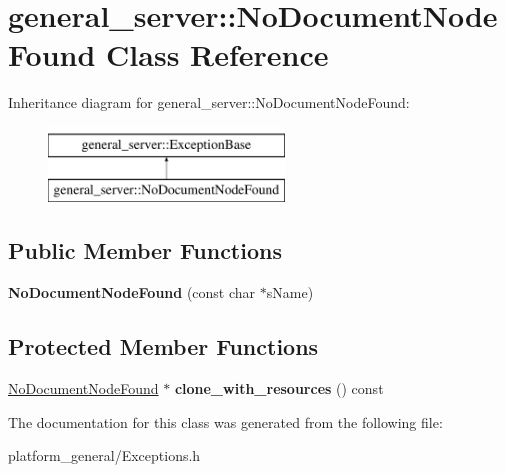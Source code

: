 \hypertarget{classgeneral__server_1_1NoDocumentNodeFound}{\section{general\-\_\-server\-:\-:\-No\-Document\-Node\-Found \-Class \-Reference}
\label{classgeneral__server_1_1NoDocumentNodeFound}
}
\-Inheritance diagram for general\-\_\-server\-:\-:\-No\-Document\-Node\-Found\-:\begin{figure}[H]
\begin{center}
\leavevmode
\includegraphics[height=2.000000cm]{classgeneral__server_1_1NoDocumentNodeFound}
\end{center}
\end{figure}
\subsection*{\-Public \-Member \-Functions}
\begin{DoxyCompactItemize}
\item 
\hypertarget{classgeneral__server_1_1NoDocumentNodeFound_a749c9293a9c289e439cbd3fee494a439}{{\bfseries \-No\-Document\-Node\-Found} (const char $\ast$s\-Name)}\label{classgeneral__server_1_1NoDocumentNodeFound_a749c9293a9c289e439cbd3fee494a439}

\end{DoxyCompactItemize}
\subsection*{\-Protected \-Member \-Functions}
\begin{DoxyCompactItemize}
\item 
\hypertarget{classgeneral__server_1_1NoDocumentNodeFound_a0ec1a01bc936b278fb94e8bdf2abd213}{\hyperlink{classgeneral__server_1_1NoDocumentNodeFound}{\-No\-Document\-Node\-Found} $\ast$ {\bfseries clone\-\_\-with\-\_\-resources} () const }\label{classgeneral__server_1_1NoDocumentNodeFound_a0ec1a01bc936b278fb94e8bdf2abd213}

\end{DoxyCompactItemize}


\-The documentation for this class was generated from the following file\-:\begin{DoxyCompactItemize}
\item 
platform\-\_\-general/\-Exceptions.\-h\end{DoxyCompactItemize}
